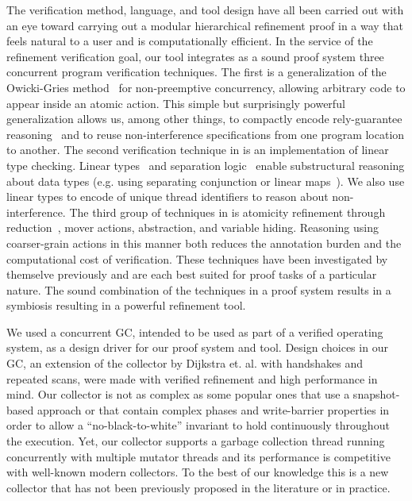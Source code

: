 The verification method, language, and tool design have all been carried out with an eye toward carrying out a modular hierarchical refinement proof in a way that feels natural to a user and is computationally efficient. 
In the service of the refinement verification goal, our tool integrates as a sound proof system three concurrent program verification techniques. 
The first \civl is a generalization of the Owicki-Gries method~\cite{OwickiG76} for non-preemptive concurrency, 
allowing arbitrary code to appear inside an atomic action. 
This simple but surprisingly powerful generalization allows us, among other things, to compactly encode rely-guarantee reasoning~\cite{Jones83}
and to reuse non-interference specifications from one program location to another.
The second verification technique in \civl is an implementation of linear type checking.
Linear types~\cite{Wadler90lineartypes} and separation logic~\cite{Reynolds02} enable substructural reasoning about data types
(e.g. using separating conjunction or linear maps~\cite{LahiriQW11}).
We also use linear types to encode of unique thread identifiers to reason about non-interference.
The third group of techniques in \civl is atomicity refinement through reduction~\cite{Lipton}, mover actions, abstraction, and variable hiding.
Reasoning using coarser-grain actions in this manner both reduces the annotation burden and the computational cost of verification. 
These techniques have been investigated by themselve previously and are each best suited for proof tasks of a particular nature. 
The sound combination of the techniques in a proof system results in a symbiosis resulting in a powerful refinement tool. 

We used a concurrent GC, intended to be used as part of a verified operating system, as a design driver for our proof system and tool. 
Design choices in our GC, an extension of the collector by Dijkstra et. al. \cite{dijk78}  with handshakes \cite{doli93,doli94} and repeated scans, were made with verified refinement and high performance in mind. 
Our collector is not as complex as some popular ones that use a snapshot-based approach \cite{doli93,doli94,doma00,azat03} or that contain complex phases and write-barrier properties \cite{boeh91,prin00a,bara05} in order to allow a ``no-black-to-white'' invariant to hold continuously throughout the execution. 
Yet, our collector supports a garbage collection thread running concurrently with multiple mutator threads and its performance is competitive with well-known modern collectors. 
To the best of our knowledge this is a new collector that has not been previously proposed in the literature or in practice. 

